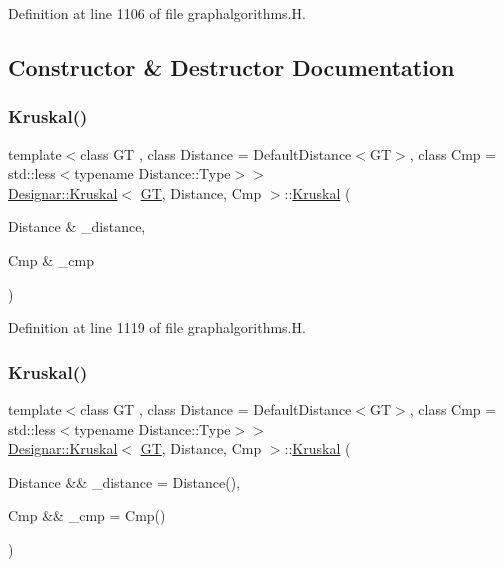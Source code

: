 Definition at line 1106 of file graphalgorithms.\+H.



\subsection{Constructor \& Destructor Documentation}
\mbox{\label{class_designar_1_1_kruskal_a930c064f2563fa43125656f6a3646882}} 
\subsubsection{\texorpdfstring{Kruskal()}{Kruskal()}\hspace{0.1cm}{\footnotesize\ttfamily [1/2]}}
{\footnotesize\ttfamily template$<$class GT , class Distance  = Default\+Distance$<$\+G\+T$>$, class Cmp  = std\+::less$<$typename Distance\+::\+Type$>$$>$ \\
\hyperlink{class_designar_1_1_kruskal}{Designar\+::\+Kruskal}$<$ \hyperlink{demo-buildgraph_8_c_a3001c40d2c31ca87ed96cd7d1334a55e}{GT}, Distance, Cmp $>$\+::\hyperlink{class_designar_1_1_kruskal}{Kruskal} (\begin{DoxyParamCaption}\item[{Distance \&}]{\+\_\+distance,  }\item[{Cmp \&}]{\+\_\+cmp }\end{DoxyParamCaption})\hspace{0.3cm}{\ttfamily [inline]}}



Definition at line 1119 of file graphalgorithms.\+H.

\mbox{\label{class_designar_1_1_kruskal_ae1108aacf254cb652fa16a8ba398e685}} 
\subsubsection{\texorpdfstring{Kruskal()}{Kruskal()}\hspace{0.1cm}{\footnotesize\ttfamily [2/2]}}
{\footnotesize\ttfamily template$<$class GT , class Distance  = Default\+Distance$<$\+G\+T$>$, class Cmp  = std\+::less$<$typename Distance\+::\+Type$>$$>$ \\
\hyperlink{class_designar_1_1_kruskal}{Designar\+::\+Kruskal}$<$ \hyperlink{demo-buildgraph_8_c_a3001c40d2c31ca87ed96cd7d1334a55e}{GT}, Distance, Cmp $>$\+::\hyperlink{class_designar_1_1_kruskal}{Kruskal} (\begin{DoxyParamCaption}\item[{Distance \&\&}]{\+\_\+distance = {\ttfamily Distance()},  }\item[{Cmp \&\&}]{\+\_\+cmp = {\ttfamily Cmp()} }\end{DoxyParamCaption})\hspace{0.3cm}{\ttfamily [inline]}}



